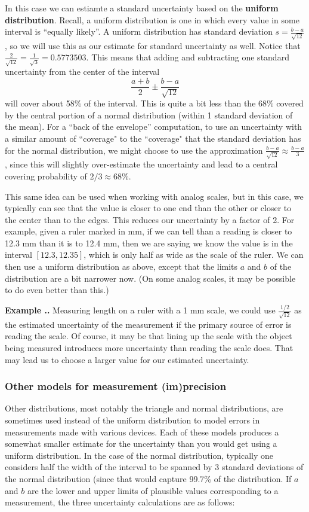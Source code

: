\documentclass[twoside]{book}\usepackage[]{graphicx}\usepackage[]{xcolor}
\def\term#1{\textbf{#1}}
\newcounter{example}[section]
\newenvironment{example}%
{\refstepcounter{example}%
\textbf{Example \thesection.\arabic{example}. }}%
{}
\begin{document}
In this case we can estiamte a standard uncertainty based on the \term{uniform distribution}.  
Recall, a uniform
distribution is one in which every value in some interval is ``equally likely''.
A uniform distribution has standard deviation $s = \frac{b-a}{\sqrt{12}}$, so we will
use this as our estimate for standard uncertainty as well.
Notice that 
$\frac{2}{\sqrt{12}} = \frac{1}{\sqrt{3}} = 0.5773503 $.
This means that adding and subtracting one standard uncertainty from the center 
of the interval
\[
\frac{a+b}{2} \pm \frac{b-a}{\sqrt{12}}
\]
will cover about 58\% of the interval.  
This is quite a bit less than the 68\% covered by the central portion of a normal 
distribution (within 1 standard deviation of the mean).
For a ``back of the envelope'' computation, to use an uncertainty with a similar amount of ``coverage" to the ``coverage" that the standard deviation has for the normal distribution, we might choose to use the approximation 
$\frac{b-a}{\sqrt{12}} \approx \frac{b-a}{3}$,
since this will slightly over-estimate the uncertainty and lead to a central covering
probability of $2/3 \approx 68\%$.

This same idea can be used when working with analog scales, but in this case, we typically
can see that the value is closer to one end than the other or closer to the center than
to the edges.  This reduces our uncertainty by a factor of 2.  For example, given a ruler
marked in mm, if we can tell than a reading is closer to 12.3 mm than it is to 12.4 mm, then we 
are saying we know the value is in the interval $[12.3, 12.35]$, which is only half as 
wide as the scale of the ruler.  We can then use a uniform distribution as above, except that the limits $a$ and $b$ of the distribution are a bit narrower now.  
(On some analog scales, it may be possible to do even better than this.)

\begin{example}
Measuring length on a ruler with a 1 mm scale, we could use $\frac{1/2}{\sqrt{12}}$
as the estimated uncertainty of the measurement if the primary source of error is reading
the scale.  Of course, it may be that lining up the scale with the object being measured
introduces more uncertainty than reading the scale does.  That may lead us to choose a 
larger value for our estimated uncertainty.
\end{example}

\subsubsection{Other models for measurement (im)precision}
Other distributions, most notably the triangle and normal distributions, are sometimes
used instead of the uniform distribution to model errors in measurements made
with various devices.  Each of these models produces a somewhat smaller estimate
for the uncertainty than you would get using a uniform distribution.  In the case of the normal distribution, typically one considers
half the width of the interval to be spanned by 3 standard deviations of the
normal distribution (since that would capture 99.7\% of the distribution.  If $a$ and $b$
are the lower and upper limits of plausible values corresponding to a measurement,
the three uncertainty calculations are as follows:
\end{document}
